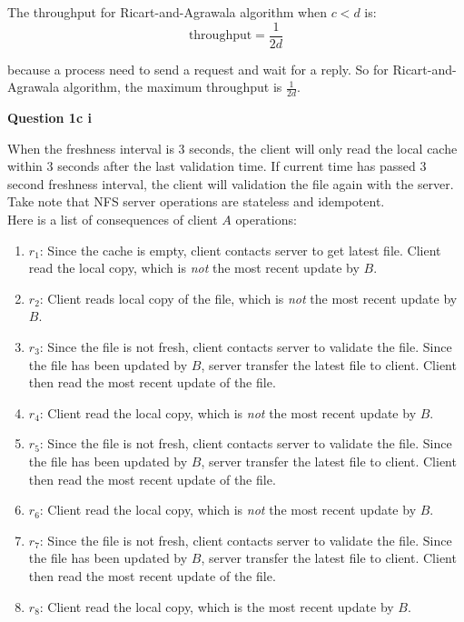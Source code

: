 \documentclass[11pt,a4paper]{report}
\begin{document}
\begin{multicols*}{2}
\noindent The throughput for Ricart-and-Agrawala algorithm when $c < d$ is:
$$\text{throughput}=\frac{1}{2d}$$

\noindent because a process need to send a request and wait for a reply. So for Ricart-and-Agrawala algorithm, the maximum throughput is $\frac{1}{2d}$. 

\noindent \textbf{Question 1c i}

\noindent When the freshness interval is 3 seconds, the client will only read the local cache within 3 seconds after the last validation time. If current time has passed 3 second freshness interval, the client will validation the file again with the server.\\

\noindent Take note that NFS server operations are stateless and idempotent.\\

\noindent Here is a list of consequences of client $A$ operations:
\begin{enumerate}
  \item $r_1$: Since the cache is empty, client contacts server to get latest file. Client read the local copy, which is \emph{not} the most recent update by $B$.
  \item $r_2$: Client reads local copy of the file, which is \emph{not} the most recent update by $B$.
  \item $r_3$: Since the file is not fresh, client contacts server to validate the file. Since the file has been updated by $B$, server transfer the latest file to client. Client then read the most recent update of the file. 
  \item $r_4$: Client read the local copy, which is \emph{not} the most recent update by $B$.
  \item $r_5$: Since the file is not fresh, client contacts server to validate the file. Since the file has been updated by $B$, server transfer the latest file to client. Client then read the most recent update of the file. 
  \item $r_6$: Client read the local copy, which is \emph{not} the most recent update by $B$.
  \item $r_7$: Since the file is not fresh, client contacts server to validate the file. Since the file has been updated by $B$, server transfer the latest file to client. Client then read the most recent update of the file. 
  \item $r_8$: Client read the local copy, which is the most recent update by $B$.
\end{enumerate}


\end{multicols*}
\end{document}
